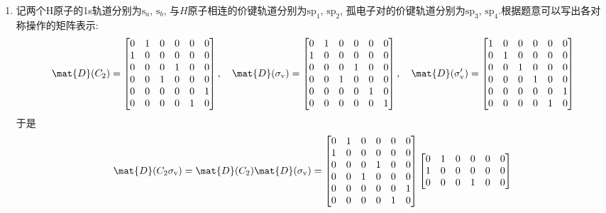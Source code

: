 \documentclass{ctexart}
\begin{document}
\begin{solution}
\begin{enumerate}[label=\tbf{(\alph*)}]
    \item 记两个H原子的1s轨道分别为$\text{s}_a$, $\text{s}_b$, 与$H$原子相连的价键轨道分别为$\text{sp}_1$, $\text{sp}_2$, 孤电子对的价键轨道分别为$\text{sp}_3$, $\text{sp}_4$.根据题意可以写出各对称操作的矩阵表示:
    \[\mat{D}(C_2)=\begin{bmatrix}
        0&1&0&0&0&0\\
        1&0&0&0&0&0\\
        0&0&0&1&0&0\\
        0&0&1&0&0&0\\
        0&0&0&0&0&1\\
        0&0&0&0&1&0
    \end{bmatrix},\quad\mat{D}(\sigma_\text{v})=\begin{bmatrix}
        0&1&0&0&0&0\\
        1&0&0&0&0&0\\
        0&0&0&1&0&0\\
        0&0&1&0&0&0\\
        0&0&0&0&1&0\\
        0&0&0&0&0&1\\
    \end{bmatrix},\quad\mat{D}(\sigma_\text{v}')=\begin{bmatrix}
        1&0&0&0&0&0\\
        0&1&0&0&0&0\\
        0&0&1&0&0&0\\
        0&0&0&1&0&0\\
        0&0&0&0&0&1\\
        0&0&0&0&1&0\\
    \end{bmatrix}\]
    于是
    \[\mat{D}(C_2\sigma_{\text{v}})=\mat{D}(C_2)\mat{D}(\sigma_\text{v})=\begin{bmatrix}
        0&1&0&0&0&0\\
        1&0&0&0&0&0\\
        0&0&0&1&0&0\\
        0&0&1&0&0&0\\
        0&0&0&0&0&1\\
        0&0&0&0&1&0
    \end{bmatrix}\begin{bmatrix}
        0&1&0&0&0&0\\
        1&0&0&0&0&0\\
        0&0&0&1&0&0\\

\end{bmatrix}\]
\end{enumerate}
\end{solution}
\end{document}
